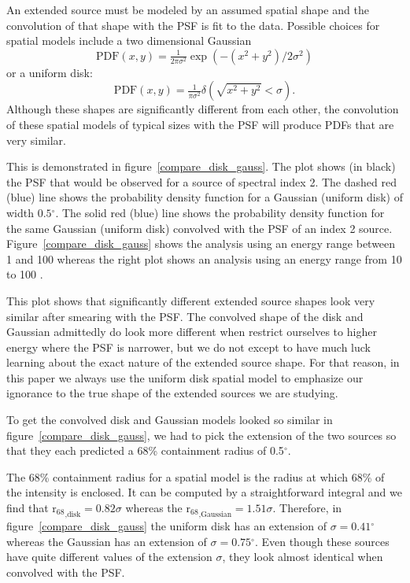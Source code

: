 \documentclass[12pt,preprint]{aastex}
\newcommand{\gev}{\text{GeV}\xspace}
\newcommand{\rsixeight}{{\ensuremath{\text{r}_{68}}}\xspace}
\renewcommand{\deg}{\ensuremath{^\circ}\xspace}
\begin{document}

An extended source must be modeled by an assumed spatial shape and
the convolution of that shape with the PSF is fit to the data.
Possible choices for spatial models include a two dimensional Gaussian
\begin{equation}
  \text{PDF}(x,y)=\tfrac{1}{2\pi\sigma^2}\exp\left(-(x^2+y^2)/2\sigma^2\right)
\end{equation}
or a uniform disk:
\begin{equation}
  \text{PDF}(x,y)=\tfrac{1}{\pi\sigma^2}\delta\left(\sqrt{x^2+y^2}<\sigma\right).
\end{equation}
Although these shapes are significantly different from each other, the
convolution of these spatial models of typical sizes with the PSF will
produce PDFs that are very similar.

This is demonstrated in figure~\ref{compare_disk_gauss}.  The plot shows
(in black) the PSF that would be observed for a source of spectral
index 2. The dashed red (blue) line shows the probability density
function for a Gaussian (uniform disk) of width $0.5\deg$.  The solid
red (blue) line shows the probability density function for the same
Gaussian (uniform disk) convolved with the PSF of an index 2 source.
Figure~\ref{compare_disk_gauss} shows the analysis using an energy range
between 1 \gev and 100 \gev whereas the right plot shows an analysis using an
energy range from 10 \gev to 100 \gev.

This plot shows that significantly different extended source shapes
look very similar after smearing with the PSF. The convolved shape of
the disk and Gaussian admittedly do look more different when restrict
ourselves to higher energy where the PSF is narrower, but we do not
except to have much luck learning about the exact nature of the
extended source shape. For that reason, in this paper we always use
the uniform disk spatial model to emphasize our ignorance to the true
shape of the extended sources we are studying.

To get the convolved disk and Gaussian models looked so similar in
figure~\ref{compare_disk_gauss}, we had to pick the extension of the two
sources so that they each predicted a 68\% containment radius of 0.5\deg.

The 68\% containment radius for a spatial model is
the radius at which 68\% of the intensity is enclosed.
It can be computed by a straightforward integral and we
find that $\rsixeight_\text{,disk}=0.82\sigma$ whereas
the $\rsixeight_\text{,Gaussian}=1.51\sigma$. Therefore, in
figure~\ref{compare_disk_gauss} the uniform disk has an extension
of $\sigma=0.41\deg$ whereas the Gaussian has an extension of
$\sigma=0.75\deg$. Even though these sources have quite different
values of the extension $\sigma$, they look almost identical when convolved
with the PSF.
\end{document}

